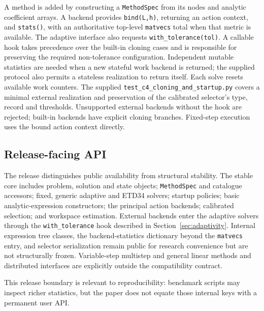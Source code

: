 A method is added by constructing a \texttt{MethodSpec} from its nodes and
analytic coefficient arrays.  A backend provides \texttt{bind(L,h)}, returning
an action context, and \texttt{stats()}, with an authoritative top-level
\texttt{matvecs} total when that metric is available.  The adaptive interface
also requests \texttt{with\_tolerance(tol)}.  A callable hook takes precedence over the built-in cloning cases and is
responsible for preserving the required non-tolerance configuration.
Independent mutable statistics are needed when a new stateful work backend
is returned; the supplied protocol also permits a stateless realization to
return itself.  Each solve resets available work counters.  The supplied
\texttt{test\_c4\_cloning\_and\_startup.py} covers a minimal external
realization and preservation of the calibrated selector's type, record and
thresholds.  Unsupported external backends without the hook are rejected;
built-in backends have explicit cloning branches.  Fixed-step execution uses
the bound action context directly.

\subsection{Release-facing API}

The release distinguishes public availability from structural stability.  The
stable core includes problem, solution and state objects; \texttt{MethodSpec}
and catalogue accessors; fixed, generic adaptive and ETD34 solvers; startup
policies; basic analytic-expression constructors; the principal action
backends; calibrated selection; and workspace estimation.  External backends
enter the adaptive solvers through the \texttt{with\_tolerance} hook described
in Section~\ref{sec:adaptivity}.  Internal expression tree classes, the
backend-statistics dictionary beyond the \texttt{matvecs} entry, and selector
serialization remain public for research convenience but are not structurally
frozen.  Variable-step multistep and general linear methods and distributed
interfaces are explicitly outside the compatibility contract.

This release boundary is relevant to reproducibility: benchmark scripts may
inspect richer statistics, but the paper does not equate those internal keys
with a permanent user API.
